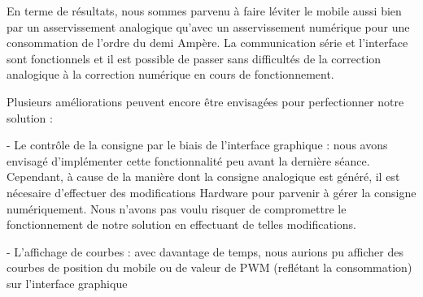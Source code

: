 \documentclass[11pt, french]{article} %
\begin{document}
\medskip

En terme de résultats, nous sommes parvenu à faire léviter le mobile aussi bien par un asservissement analogique qu'avec un asservissement numérique pour une consommation de l'ordre du demi Ampère. La communication série et l'interface sont fonctionnels et il est possible de passer sans difficultés de la correction analogique à la correction numérique en cours de fonctionnement. 

\medskip

Plusieurs améliorations peuvent encore être envisagées pour perfectionner notre solution :

- Le contrôle de la consigne par le biais de l'interface graphique : nous avons envisagé d'implémenter cette fonctionnalité peu avant la dernière séance. Cependant, à cause de la manière dont la consigne analogique est généré, il est nécesaire d'effectuer des modifications Hardware pour parvenir à gérer la consigne numériquement. Nous n'avons pas voulu risquer de compromettre le fonctionnement de notre solution en effectuant de telles modifications.

- L'affichage de courbes : avec davantage de temps, nous aurions pu afficher des courbes de position du mobile ou de valeur de PWM (reflétant la consommation) sur l'interface graphique
\end{document}

